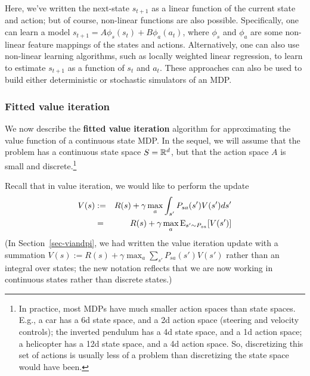 \documentclass{article}
\begin{document}

Here, we've written the next-state $s_{t+1}$ as a linear function of the current state
and action; but of course, non-linear functions are also possible.
Specifically, one can learn
a model $s_{t+1} = A \phi_s(s_{t}) + B \phi_a(a_{t})$, where
$\phi_s$ and $\phi_a$ are some non-linear feature mappings of the states and
actions.   Alternatively, one can also use non-linear learning algorithms, such as locally weighted linear
regression, to learn to estimate $s_{t+1}$ as a function of $s_t$ and $a_t$.
These approaches can also be used to build either deterministic or stochastic simulators
of an MDP.

\subsubsection{Fitted value iteration}

We now describe the {\bf fitted value iteration} algorithm for approximating
the value function of a continuous state MDP.  In the sequel, we will assume
that the problem has a continuous state space $S = {\mathbb R}^{d}$, but that the action
space $A$ is small and discrete.\footnote{In practice, most MDPs have much
smaller action spaces than state spaces. E.g., a car has a 6d state space, and a
2d action space (steering and velocity controls); the inverted pendulum has a
4d state space, and a 1d action space; a helicopter has a 12d state space, and a
4d action space.  So, discretizing this set of actions is usually less of a
problem than discretizing the state space would have been.}

Recall that in value iteration, we would like to perform the update
\begin{eqnarray}
V(s) &:=& R(s) + \gamma \max_a \int_{s'} P_{sa}(s') V(s') ds' \\
&=& R(s) + \gamma \max_a {\rm E}_{s' \sim P_{sa}} [V(s')]        \label{eqn-viexpectation}
\end{eqnarray}
(In Section~\ref{sec-viandpi}, we had written the value iteration update
with a summation $V(s) := R(s) + \gamma \max_a \sum_{s'} P_{sa}(s') V(s')$
rather than an integral over states; the new notation reflects that we are now working
in continuous states rather than discrete states.)
\end{document}
